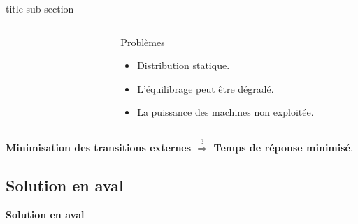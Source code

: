 \begin{frame}{title sub section}
\begin{columns}
\begin{column}{0.3\textwidth}
\begin{figure}
\begin{tikzpicture}
					\end{tikzpicture}
				\end{figure}
			\end{column}
		
         \begin{column}{0.7\textwidth}
         	
         	\begin{block}{Problèmes}
         		\begin{itemize}
         		\item Distribution statique.%
         		\item L'équilibrage peut être dégradé.%
         		\item La puissance des machines non exploitée.%
         	 \end{itemize}
           \end{block}
         \end{column}
		\end{columns}
 \vspace{0.5cm}
\textbf{ Minimisation des transitions externes \color{red} $\stackrel{?}{\Rightarrow}$ Temps de réponse minimisé}.  
\end{frame}

\subsection{Solution en aval}
\begin{frame}
	\centering
	\vspace{2.2cm}       
	\Huge 
	\textbf{Solution en aval}
\end{frame}

